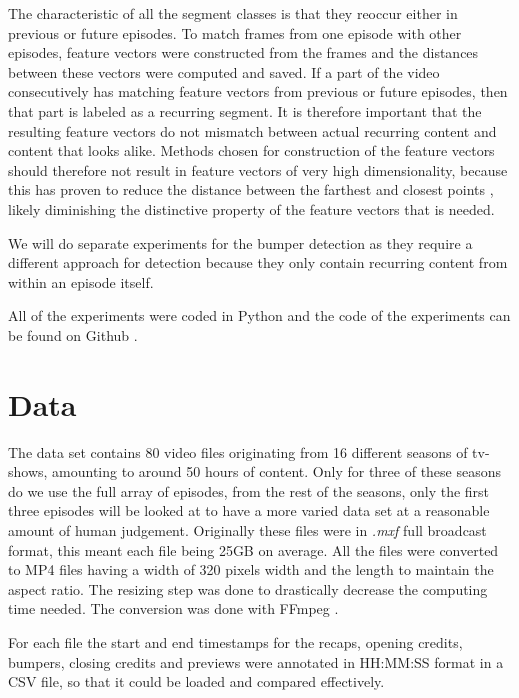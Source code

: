 \documentclass{report}
\begin{document}
The characteristic of all the segment classes is that they reoccur either in previous or future episodes. To match frames from one episode with other episodes, feature vectors were constructed from the frames and the distances between these vectors were computed and saved. If a part of the video consecutively has matching feature vectors from previous or future episodes, then that part is labeled as a recurring segment. It is therefore important that the resulting feature vectors do not mismatch between actual recurring content and content that looks alike. Methods chosen for construction of the feature vectors should therefore not result in feature vectors of very high dimensionality, because this has proven to reduce the distance between the farthest and closest points \cite{beyer1999nearest}, likely diminishing the distinctive property of the feature vectors that is needed.

We will do separate experiments for the bumper detection as they require a different approach for detection because they only contain recurring content from within an episode itself.

All of the experiments were coded in Python and the code of the experiments can be found on Github \cite{own-github}.
\section{Data}
The data set contains 80 video files originating from 16 different seasons of tv-shows, amounting to around 50 hours of content. Only for three of these seasons do we use the full array of episodes, from the rest of the seasons, only the first three episodes will be looked at to have a more varied data set at a reasonable amount of human judgement. Originally these files were in \textit{.mxf} full broadcast format, this meant each file being 25GB on average. All the files were converted to MP4 files having a width of 320 pixels width and the length to maintain the aspect ratio. The resizing step was done to drastically decrease the computing time needed. The conversion was done with FFmpeg \cite{ffmpeg}.

For each file the start and end timestamps for the recaps, opening credits, bumpers, closing credits and previews were annotated in HH:MM:SS format in a CSV file, so that it could be loaded and compared effectively.
\end{document}
